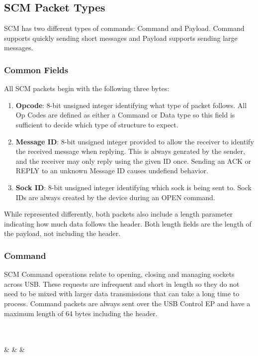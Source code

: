 \documentclass[10pt]{article}
\begin{document}
	\subsection{SCM Packet Types}
	SCM has two different types of commands: Command and Payload. Command supports quickly sending short messages and Payload supports sending large messages.
	\subsubsection{Common Fields}
	All SCM packets begin with the following three bytes:\\
	\begin{enumerate}
		\item \textbf{Opcode}: 8-bit unsigned integer identifying what type of packet follows. All Op Codes are defined as either a Command or Data type so this field is sufficient to decide which type of structure to expect.
		\item \textbf{Message ID}: 8-bit unsigned integer provided to allow the receiver to identify the received message when replying. This is always genrated by the sender, and the receiver may only reply using the given ID once. Sending an ACK or REPLY to an unknown Message ID causes undefiend behavior.
		\item \textbf{Sock ID}: 8-bit unsigned integer identifying which sock is being sent to. Sock IDs are always created by the device during an OPEN command.
	\end{enumerate}
	While represented differently, both packets also include a length parameter indicating how much data follows the header. Both length fields are the length of the payload, not including the header. 
	\subsubsection{Command}
	SCM Command operations relate to opening, closing and managing sockets across USB. These requests are infrequent and short in length so they do not need to be mixed with larger data transmissions that can take a long time to process. Command packets are always sent over the USB Control EP and have a maximum length of 64 bytes including the header.\\
	\\
	\begin{bytefield}[bitwidth=1.7em]{32}
		 \\
		 &
		 &
		 &
		 \\
		 \\
	\end{bytefield}\\ 
\end{document}
